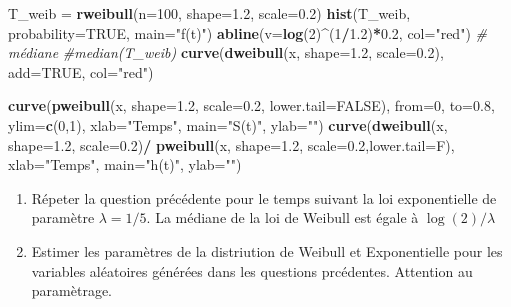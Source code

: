\documentclass[
]{article}
\newenvironment{Shaded}{\begin{snugshade}}{\end{snugshade}}
\newcommand{\CommentTok}[1]{\textcolor[rgb]{0.56,0.35,0.01}{\textit{#1}}}
\newcommand{\DataTypeTok}[1]{\textcolor[rgb]{0.13,0.29,0.53}{#1}}
\newcommand{\DecValTok}[1]{\textcolor[rgb]{0.00,0.00,0.81}{#1}}
\newcommand{\FloatTok}[1]{\textcolor[rgb]{0.00,0.00,0.81}{#1}}
\newcommand{\KeywordTok}[1]{\textcolor[rgb]{0.13,0.29,0.53}{\textbf{#1}}}
\newcommand{\NormalTok}[1]{#1}
\newcommand{\OperatorTok}[1]{\textcolor[rgb]{0.81,0.36,0.00}{\textbf{#1}}}
\newcommand{\OtherTok}[1]{\textcolor[rgb]{0.56,0.35,0.01}{#1}}
\newcommand{\StringTok}[1]{\textcolor[rgb]{0.31,0.60,0.02}{#1}}
\begin{document}
\begin{Shaded}
\begin{Highlighting}[]
\NormalTok{T_weib =}\StringTok{ }\KeywordTok{rweibull}\NormalTok{(}\DataTypeTok{n=}\DecValTok{100}\NormalTok{, }\DataTypeTok{shape=}\FloatTok{1.2}\NormalTok{, }\DataTypeTok{scale=}\FloatTok{0.2}\NormalTok{)}
\KeywordTok{hist}\NormalTok{(T_weib, }\DataTypeTok{probability=}\OtherTok{TRUE}\NormalTok{, }\DataTypeTok{main=}\StringTok{"f(t)"}\NormalTok{)}
\KeywordTok{abline}\NormalTok{(}\DataTypeTok{v=}\KeywordTok{log}\NormalTok{(}\DecValTok{2}\NormalTok{)}\OperatorTok{^}\NormalTok{(}\DecValTok{1}\OperatorTok{/}\FloatTok{1.2}\NormalTok{)}\OperatorTok{*}\FloatTok{0.2}\NormalTok{, }\DataTypeTok{col=}\StringTok{"red"}\NormalTok{) }\CommentTok{# médiane}
\CommentTok{#median(T_weib)}
\KeywordTok{curve}\NormalTok{(}\KeywordTok{dweibull}\NormalTok{(x, }\DataTypeTok{shape=}\FloatTok{1.2}\NormalTok{, }\DataTypeTok{scale=}\FloatTok{0.2}\NormalTok{), }\DataTypeTok{add=}\OtherTok{TRUE}\NormalTok{, }\DataTypeTok{col=}\StringTok{"red"}\NormalTok{)}

\KeywordTok{curve}\NormalTok{(}\KeywordTok{pweibull}\NormalTok{(x, }\DataTypeTok{shape=}\FloatTok{1.2}\NormalTok{, }\DataTypeTok{scale=}\FloatTok{0.2}\NormalTok{, }\DataTypeTok{lower.tail=}\OtherTok{FALSE}\NormalTok{), }
              \DataTypeTok{from=}\DecValTok{0}\NormalTok{, }\DataTypeTok{to=}\FloatTok{0.8}\NormalTok{, }\DataTypeTok{ylim=}\KeywordTok{c}\NormalTok{(}\DecValTok{0}\NormalTok{,}\DecValTok{1}\NormalTok{), }
              \DataTypeTok{xlab=}\StringTok{"Temps"}\NormalTok{, }\DataTypeTok{main=}\StringTok{"S(t)"}\NormalTok{, }\DataTypeTok{ylab=}\StringTok{""}\NormalTok{)}
\KeywordTok{curve}\NormalTok{(}\KeywordTok{dweibull}\NormalTok{(x, }\DataTypeTok{shape=}\FloatTok{1.2}\NormalTok{, }\DataTypeTok{scale=}\FloatTok{0.2}\NormalTok{)}\OperatorTok{/}
\StringTok{        }\KeywordTok{pweibull}\NormalTok{(x, }\DataTypeTok{shape=}\FloatTok{1.2}\NormalTok{, }\DataTypeTok{scale=}\FloatTok{0.2}\NormalTok{,}\DataTypeTok{lower.tail=}\NormalTok{F), }
        \DataTypeTok{xlab=}\StringTok{"Temps"}\NormalTok{, }\DataTypeTok{main=}\StringTok{"h(t)"}\NormalTok{, }\DataTypeTok{ylab=}\StringTok{""}\NormalTok{)}
\end{Highlighting}
\end{Shaded}

\begin{enumerate}
\def\labelenumi{\arabic{enumi})}
\setcounter{enumi}{10}
\item
  Répeter la question précédente pour le temps suivant la loi
  exponentielle de paramètre \(\lambda=1/5\). La médiane de la loi de
  Weibull est égale à \(\log(2)/{\lambda}\)
\item
  Estimer les paramètres de la distriution de Weibull et Exponentielle
  pour les variables aléatoires générées dans les questions prcédentes.
  Attention au paramètrage.
\end{enumerate}
\end{document}
